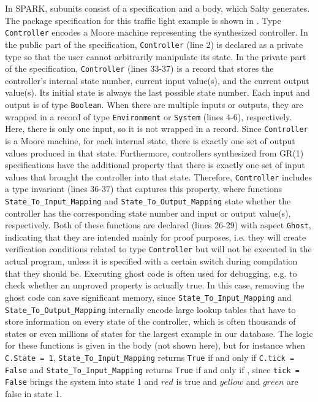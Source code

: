 \documentclass[runningheads]{llncs}
\begin{document}
In SPARK, subunits consist of a specification and a body, 
which Salty generates. 
The package specification for this traffic light example is shown in .
Type \lstinline{Controller} encodes a Moore machine representing the synthesized controller. 
In the public part of the specification, \lstinline{Controller} (line 2) is declared as a private type so that the user cannot arbitrarily manipulate its state.  
In the private part of the specification, \lstinline{Controller} (lines 33-37) is a record that stores the controller's internal state number, 
current input value(s), and the current output value(s). 
Its initial state is always the last possible state number. 
Each input and output is of type \lstinline{Boolean}. 
When there are multiple inputs or outputs, they are wrapped in a record of type \lstinline{Environment} or \lstinline{System} (lines 4-6), respectively. 
Here, there is only one input, so it is not wrapped in a record. 
Since \lstinline{Controller} is a Moore machine, for each internal state, 
there is exactly one set of output values produced in that state. 
Furthermore, controllers synthesized from GR(1) specifications have the additional property that 
there is exactly one set of input values that brought the controller into that state. 
Therefore, \lstinline{Controller} includes a type invariant (lines 36-37) that captures this property, 
where functions \lstinline{State_To_Input_Mapping} and \lstinline{State_To_Output_Mapping} state whether the controller has the corresponding state number and input or output value(s), respectively. 
Both of these functions are declared (lines 26-29) with aspect \lstinline{Ghost}, indicating that they are intended mainly for proof purposes, 
i.e. they will create verification conditions related to type \lstinline{Controller} but will not be executed in the actual program, 
unless it is specified with a certain switch during compilation that they should be.
Executing ghost code is often used for debugging, e.g. to check whether an unproved property is actually true. 
In this case, removing the ghost code can save significant memory, 
since \lstinline{State_To_Input_Mapping} and \lstinline{State_To_Output_Mapping} 
internally encode large lookup tables that have to store information on every state of the controller, 
which is often thousands of states or even millions of states for the largest example in our database.
The logic for these functions is given in the body (not shown here), but for instance when \lstinline{C.State = 1}, 
\lstinline{State_To_Input_Mapping} returns \lstinline{True} if and only if \lstinline{C.tick = False} and 
\lstinline{State_To_Input_Mapping} returns \lstinline{True} if and only if 
, 
since \lstinline{tick = False} brings the system into state 1 and $red$ is true and $yellow$ and $green$ are false in state 1.
 
\end{document}

